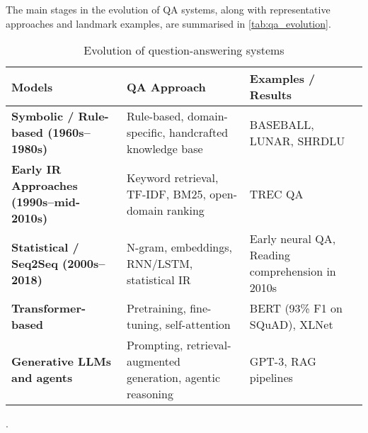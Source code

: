 \begin{spacing}{1.5}
The main stages in the evolution of QA systems, along with representative approaches and landmark examples, are summarised in \autoref{tab:qa_evolution}.

\addtocounter{table}{-1}
\begin{table}[H]
\centering
\begin{tabularx}{\textwidth}{>{\raggedright\arraybackslash\bfseries}X >{\raggedright\arraybackslash}X >{\raggedright\arraybackslash}X}
\toprule
\textbf{Models} & \textbf{QA Approach} & \textbf{Examples / Results}\\
\midrule
Symbolic / Rule-based (1960s–1980s) & Rule-based, domain-specific, handcrafted knowledge base & BASEBALL, LUNAR, SHRDLU \\
Early IR Approaches (1990s–mid-2010s) & Keyword retrieval, TF-IDF, BM25, open-domain ranking & TREC QA \\
Statistical / Seq2Seq (2000s–2018) & N-gram, embeddings, RNN/LSTM, statistical IR & Early neural QA, Reading comprehension in 2010s \\
Transformer-based & Pretraining, fine-tuning, self-attention & BERT (93\% F1 on SQuAD), XLNet \\
Generative LLMs and agents & Prompting, retrieval-augmented generation, agentic reasoning & GPT-3, RAG pipelines \\
\bottomrule
\end{tabularx}
\vspace{0.5em}
\caption{Evolution of question-answering systems}.
\label{tab:qa_evolution}
\end{table}

\end{spacing}
